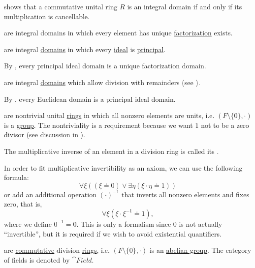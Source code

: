 \begin{definition}
\begin{thmenum}[resume=def:semiring]
     shows that a commutative unital ring \( R \) is an integral domain if and only if its multiplication is cancellable.

      are integral domains in which every element has unique \hyperref[def:factorization_in_ring]{factorization} exists.

      are integral \hyperref[def:semiring/integral_domain]{domains} in which every \hyperref[def:semiring_ideal]{ideal} is \hyperref[def:principal_ideal]{principal}.

    By , every principal ideal domain is a unique factorization domain.

      are integral \hyperref[def:semiring/integral_domain]{domains} which allow division with remainders (see ).

    By , every Euclidean domain is a principal ideal domain.

      are nontrivial unital \hyperref[def:semiring/unital_ring]{rings} in which all nonzero elements are units, i.e. \( (F \setminus \{ 0 \}, \cdot) \) is a \hyperref[def:group]{group}. The nontriviality is a requirement because we want \( 1 \) not to be a zero divisor (see discussion in ).

    The multiplicative inverse of an element in a division ring is called its .

    In order to fit multiplicative invertibility as an axiom, we can use the following formula:
    \begin{equation*}
      \forall \xi ((\xi \doteq 0) \lor \exists \eta (\xi \cdot \eta \doteq 1))
    \end{equation*}
    or add an additional operation \( (\cdot)^{-1} \) that inverts all nonzero elements and fixes zero, that is,
    \begin{equation*}
      \forall \xi (\xi \cdot \xi^{-1} \doteq 1),
    \end{equation*}
    where we define \( 0^{-1} = 0 \). This is only a formalism since \( 0 \) is not actually \enquote{invertible}, but it is required if we wish to avoid existential quantifiers.

      are \hyperref[def:magma/commutative]{commutative} division \hyperref[def:semiring/division_ring]{rings}, i.e. \( (F \setminus \{ 0 \}, \cdot) \) is an \hyperref[def:abelian_group]{abelian group}. The category of fields is denoted by \( \cat{Field} \).
  \end{thmenum}
\end{definition}


